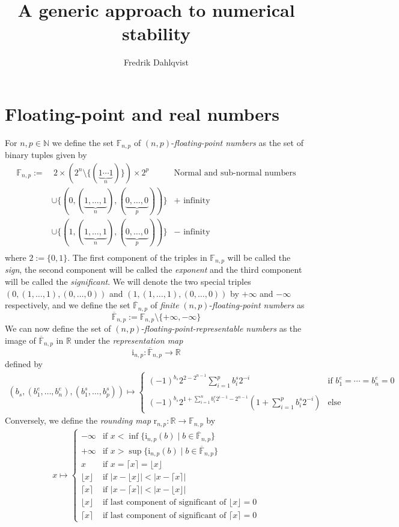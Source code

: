 \documentclass[10pt,a4paper]{article}
\title{A generic approach to numerical stability}
\author{Fredrik Dahlqvist}
\date{}
\theoremstyle{plain}
\theoremstyle{definition}
\newcommand{\F}[1][n,p]{\mathbb{F}_{#1}}
\newcommand{\Ff}[1][n,p]{\overline{\mathbb{F}}_{#1}}
\newcommand{\N}{\mathbb{N}}
\newcommand{\R}{\mathbb{R}}
\newcommand{\Rep}[1][n,p]{\mathrm{i}_{#1}}
\newcommand{\Round}[1][n,p]{\mathrm{r}_{#1}}
\newcommand{\absv}[1]{\vert #1\vert}
\newcommand{\ceil}[1]{\lceil #1 \rceil}
\newcommand{\floor}[1]{\lfloor #1 \rfloor}
\begin{document}
\maketitle

\section{Floating-point and real numbers}

For $n,p\in\N$ we define the set $\F$ of $(n,p)$-\emph{floating-point numbers} as the set of binary tuples given by
\begin{align*}
\F:=&~2\times \left(2^n\setminus\{(\underbrace{1\cdots 1}_n)\}\right)\times 2^p &\text{Normal and sub-normal numbers}\\
&\cup \{(0,(\underbrace{1,\ldots,1}_n),(\underbrace{0,\ldots, 0}_p))\}&+\text{ infinity}\\
&\cup \{(1,(\underbrace{1,\ldots,1}_n),(\underbrace{0,\ldots, 0}_p))\}&-\text{ infinity}\\
\end{align*}
where $2:=\{0,1\}$. The first component of the triples in $\F$ will be called the \emph{sign}, the second component will be called the \emph{exponent} and the third component will be called the \emph{significant}. We will denote the two special triples $(0,(1,\ldots,1),(0,\ldots, 0))$ and $(1,(1,\ldots,1),(0,\ldots, 0))$ by $+\infty$ and $-\infty$ respectively, and we define  the set $\Ff$ of \emph{finite} $(n,p)$-\emph{floating-point numbers} as 
\[
\Ff:=\F \setminus \{+\infty,-\infty\}
\]
We can now define the set of $(n,p)$-\emph{floating-point-representable numbers} as the image of $\Ff$ in $\R$ under the \emph{representation map}
\[
\Rep: \Ff \to \R
\]
defined by
\begin{align*}
(b_s,(b^e_1,\ldots,b^e_n),(b^s_1,\ldots,b^s_p))\mapsto
\begin{cases}
(-1)^{b_s}2^{2-2^{n-1}}\sum_{i=1}^p b^s_i2^{-i} & \text{if }b^e_1=\cdots=b^e_n=0\\ \\
(-1)^{b_s}2^{1+\sum_{i=1}^n b_i^e 2^{i-1} -2^{n-1}} \left(1+\sum_{i=1}^p b^s_i2^{-i}\right)& \text{else }
\end{cases}
\end{align*}
Conversely, we define the \emph{rounding map} $\Round: \R\to\F$ by
\begin{align*}
x\mapsto 
\begin{cases}
-\infty&\text{if } x< \inf\{\Rep(b)\mid b\in \Ff\}\\
+\infty&\text{if } x> \sup\{\Rep(b)\mid b\in \Ff\}\\
x&\text{if }x=\ceil{x}=\floor{x}\\
\floor{x} &\text{if } \absv{x-\floor{x}}< \absv{x-\ceil{x}} \\ 
\ceil{x} &\text{if } \absv{x-\ceil{x}}< \absv{x-\floor{x}} \\ 
\floor{x} &\text{if last component of significant of }\floor{x}=0\\ 
\ceil{x} &\text{if last component of significant of }\ceil{x}=0
\end{cases}
\end{align*}
\end{document}
